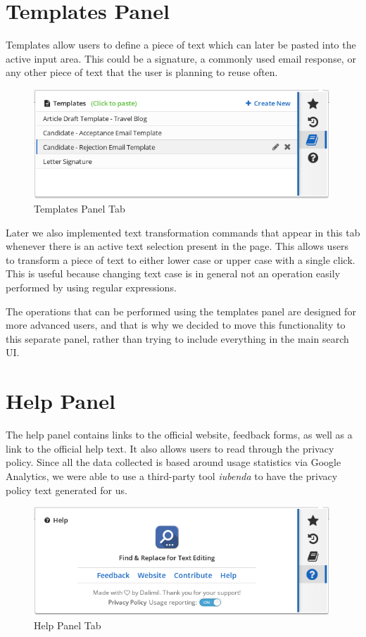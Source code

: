 \documentclass[bsc,frontabs,twoside,singlespacing,parskip,deptreport]{infthesis}
\begin{document}
\section{Templates Panel}
Templates allow users to define a piece of text which can later be pasted into the active input area. This could be a signature, a commonly used email response, or any other piece of text that the user is planning to reuse often.

\begin{figure}[h]
\centering
\includegraphics[width=0.99\textwidth]{../main/images/help/templates.png}
\caption{Templates Panel Tab}
\end{figure}

Later we also implemented text transformation commands that appear in this tab whenever there is an active text selection present in the page. This allows users to transform a piece of text to either lower case or upper case with a single click. This is useful because changing text case is in general not an operation easily performed by using regular expressions.

The operations that can be performed using the templates panel are designed for more advanced users, and that is why we decided to move this functionality to this separate panel, rather than trying to include everything in the main search UI.

\section{Help Panel}
The help panel contains links to the official website, feedback forms, as well as a link to the official help text. It also allows users to read through the privacy policy. Since all the data collected is based around usage statistics via Google Analytics, we were able to use a third-party tool \textit{iubenda} \cite{A25} to have the privacy policy text generated for us.

\begin{figure}[h]
\centering
\includegraphics[width=0.99\textwidth]{../main/images/help/help-panel.png}
\caption{Help Panel Tab}
\end{figure}
\end{document}
